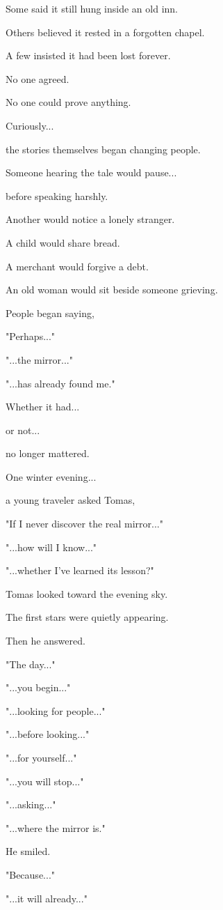 \documentclass[12pt,openany]{book}
\begin{document}
Some said it still hung inside an old inn.

Others believed it rested in a forgotten chapel.

A few insisted it had been lost forever.

No one agreed.

No one could prove anything.

Curiously...

the stories themselves began changing people.

Someone hearing the tale would pause...

before speaking harshly.

Another would notice a lonely stranger.

A child would share bread.

A merchant would forgive a debt.

An old woman would sit beside someone grieving.

People began saying,

"Perhaps..."

"...the mirror..."

"...has already found me."

Whether it had...

or not...

no longer mattered.

One winter evening...

a young traveler asked Tomas,

"If I never discover the real mirror..."

"...how will I know..."

"...whether I've learned its lesson?"

Tomas looked toward the evening sky.

The first stars were quietly appearing.

Then he answered.

"The day..."

"...you begin..."

"...looking for people..."

"...before looking..."

"...for yourself..."

"...you will stop..."

"...asking..."

"...where the mirror is."

He smiled.

"Because..."

"...it will already..."
\end{document}

